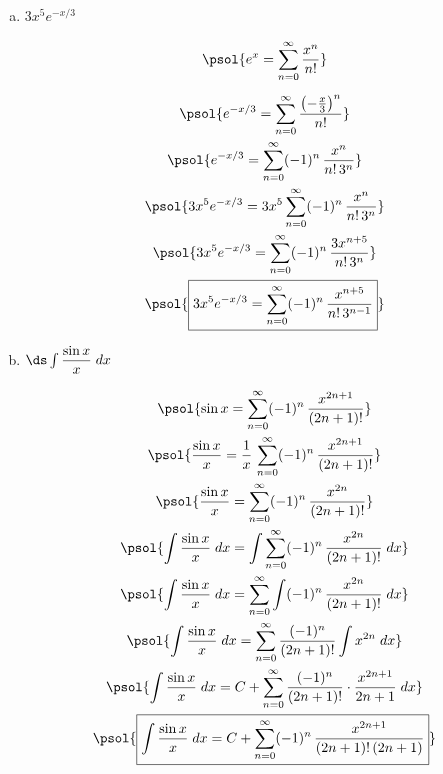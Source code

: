 \documentclass[12pt,letterpaper]{exam}
\begin{document}
\begin{questions}
\begin{enumerate}[(a)]
	\newpage
	
	\item $3x^5 e^{-x/3}$ \par\vspace{0.1cm}
		\[
		\begin{gathered}
		\psol{e^x= \sum_{n=0}^\infty \dfrac{x^n}{n!}} \\[0.2cm]
		\psol{e^{-x/3}= \sum_{n=0}^\infty \dfrac{\left(-\tfrac{x}{3} \right)^n}{n!}} \\
		\psol{e^{-x/3}= \sum_{n=0}^\infty (-1)^n\, \dfrac{x^n}{n! \, 3^n}} \\
		\psol{3x^5 e^{-x/3}= 3x^5 \sum_{n=0}^\infty (-1)^n\, \dfrac{x^n}{n! \, 3^n}} \\
		\psol{3x^5 e^{-x/3}= \sum_{n=0}^\infty (-1)^n\, \dfrac{3x^{n+5}}{n! \, 3^n}} \\
		\psol{\boxed{3x^5 e^{-x/3}= \sum_{n=0}^\infty (-1)^n\, \dfrac{x^{n+5}}{n! \, 3^{n-1}}}} 
		\end{gathered}
		\] \par\vspace{0.3cm}
	
	\item $\ds\int \dfrac{\sin x}{x} \;dx$ \par\vspace{0.1cm}
		\[
		\begin{gathered}
		\psol{\sin x= \sum_{n=0}^\infty (-1)^n\, \dfrac{x^{2n+1}}{(2n + 1)!}} \\
		\psol{\dfrac{\sin x}{x}= \dfrac{1}{x} \,\sum_{n=0}^\infty (-1)^n\, \dfrac{x^{2n+1}}{(2n + 1)!}} \\
		\psol{\dfrac{\sin x}{x}= \sum_{n=0}^\infty (-1)^n\, \dfrac{x^{2n}}{(2n + 1)!}} \\
		\psol{\int \dfrac{\sin x}{x} \;dx= \int \sum_{n=0}^\infty (-1)^n\, \dfrac{x^{2n}}{(2n + 1)!} \;dx} \\
		\psol{\int \dfrac{\sin x}{x} \;dx= \sum_{n=0}^\infty \int (-1)^n\, \dfrac{x^{2n}}{(2n + 1)!} \;dx} \\
		\psol{\int \dfrac{\sin x}{x} \;dx= \sum_{n=0}^\infty \dfrac{(-1)^n}{(2n + 1)!} \int x^{2n} \;dx} \\
		\psol{\int \dfrac{\sin x}{x} \;dx= C + \sum_{n=0}^\infty \dfrac{(-1)^n}{(2n + 1)!} \cdot \dfrac{x^{2n+1}}{2n + 1} \;dx} \\
		\psol{\boxed{\int \dfrac{\sin x}{x} \;dx= C + \sum_{n=0}^\infty (-1)^n\, \dfrac{x^{2n + 1}}{(2n + 1)! \, (2n+1)}}}
		\end{gathered}
		\]
	\end{enumerate}




\end{questions}
\end{document}
